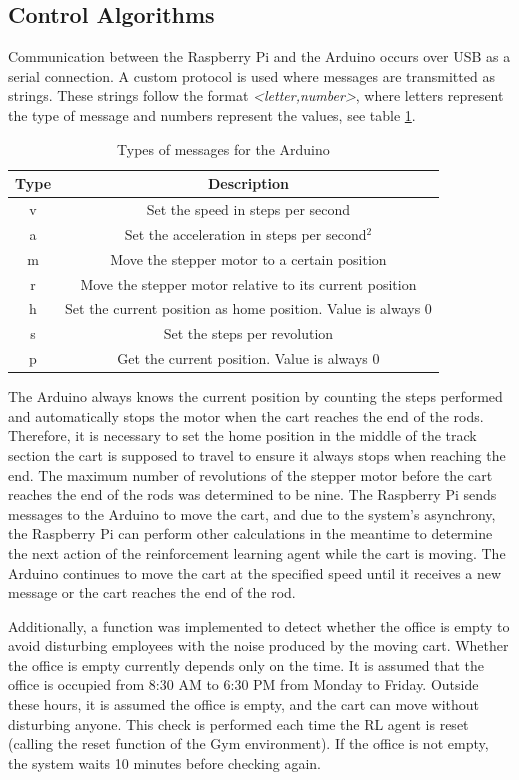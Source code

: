 \subsection{Control Algorithms}
Communication between the Raspberry Pi and the Arduino occurs over USB as a serial connection. A custom protocol is used where messages are transmitted as strings. These strings follow the format \textit{<letter,number>}, where letters represent the type of message and numbers represent the values, see table \ref{tab:types_of_messages}.
\begin{table}
    \centering
    \caption{Types of messages for the Arduino}
    \label{tab:types_of_messages}
    \begin{tabular}{|c|c|}
        \hline
        Type & Description \\
        \hline
        v & Set the speed in steps per second \\
        a & Set the acceleration in steps per second$^2$ \\
        m & Move the stepper motor to a certain position \\
        r & Move the stepper motor relative to its current position \\
        h & Set the current position as home position. Value is always 0 \\
        s & Set the steps per revolution \\
        p & Get the current position. Value is always 0 \\
        \hline
    \end{tabular}
    \end{table}
The Arduino always knows the current position by counting the steps performed and automatically stops the motor when the cart reaches the end of the rods. Therefore, it is necessary to set the home position in the middle of the track section the cart is supposed to travel to ensure it always stops when reaching the end. The maximum number of revolutions of the stepper motor before the cart reaches the end of the rods was determined to be nine. The Raspberry Pi sends messages to the Arduino to move the cart, and due to the system's asynchrony, the Raspberry Pi can perform other calculations in the meantime to determine the next action of the reinforcement learning agent while the cart is moving. The Arduino continues to move the cart at the specified speed until it receives a new message or the cart reaches the end of the rod.

Additionally, a function was implemented to detect whether the office is empty to avoid disturbing employees with the noise produced by the moving cart. Whether the office is empty currently depends only on the time. It is assumed that the office is occupied from 8:30 AM to 6:30 PM from Monday to Friday. Outside these hours, it is assumed the office is empty, and the cart can move without disturbing anyone. This check is performed each time the RL agent is reset (calling the reset function of the Gym environment). If the office is not empty, the system waits 10 minutes before checking again.